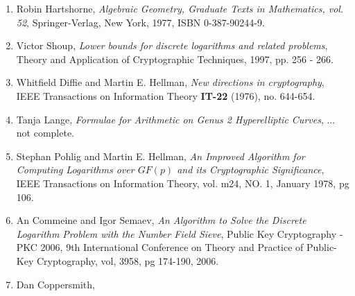 

\begin{enumerate}[1]
	\item \label{Hartshorne} Robin Hartshorne, \textit{Algebraic Geometry, Graduate Texts in Mathematics, vol. 52}, Springer-Verlag, New York, 1977, ISBN 0-387-90244-9.   
	
	\item \label{VictorShoup} Victor Shoup, \textit{Lower bounds for discrete logarithms and related problems}, Theory and Application of Cryptographic Techniques, 1997, pp. 256 - 266. 
	
	\item \label{WhitfieldDiffieMartinHellman} Whitfield Diffie and Martin E. Hellman, \textit{New directions in cryptography}, IEEE Transactions on Information Theory \textbf{IT-22} (1976), no. 644-654.  

	\item \label{TanjaLange} Tanja Lange, \textit{Formulae for Arithmetic on Genus 2 Hyperelliptic Curves}, ... not complete.

	\item \label{PohligHellman} Stephan Pohlig and Martin E. Hellman, \textit{An Improved Algorithm for Computing Logarithms over $GF(p)$ and its Cryptographic Significance}, IEEE Transactions on Information Theory, vol. m24, NO. 1, January 1978, pg 106.  

	\item \label{NFStoDLP} An Commeine and Igor Semaev, \textit{An Algorithm to Solve the Discrete Logarithm Problem with the Number Field Sieve}, Public Key Cryptography - PKC 2006, 9th International Conference on Theory and Practice of Public-Key Cryptography, vol, 3958, pg 174-190, 2006. 

	\item \label{DanCoppersmith} Dan Coppersmith, 
\end{enumerate}